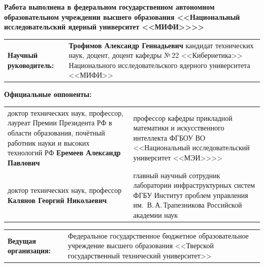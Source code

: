 \documentclass[12pt,a5paper]{article}
\begin{document}
{\scriptsize
\begin{center}
\textbf{Работа выполнена в федеральном государственном автономном
образовательном учреждении высшего образования
<<Национальный исследовательский ядерный университет <<МИФИ>>{}>>}
\end{center}

\vspace{0.15cm}

\noindent\begin{tabular}{@{}p{2.8cm}p{7.4cm}@{}}
\textbf{Научный руководитель:} & \textbf{Трофимов Александр Геннадьевич} \newline
кандидат технических наук, доцент, доцент кафедры №\,22 <<Кибернетика>> Национального исследовательского ядерного университета <<МИФИ>> \\
\end{tabular}

\vspace{0.15cm}

\noindent\textbf{Официальные оппоненты:}
\vspace{0.03cm}

\noindent\begin{tabular}{@{}p{2.8cm}p{7.4cm}@{}}
доктор технических наук, профессор, лауреат Премии Президента РФ в области образования, почётный работник науки и высоких технологий РФ
\newline \textbf{Еремеев Александр Павлович} &
профессор кафедры прикладной математики и искусственного интеллекта ФГБОУ ВО <<Национальный исследовательский университет <<МЭИ>>{}>> \\[0.1cm]

доктор технических наук, профессор
\newline \textbf{Калянов Георгий Николаевич} &
главный научный сотрудник лаборатории инфраструктурных систем ФГБУ Институт проблем управления им.~В.\,А.\,Трапезникова Российской академии наук \\
\end{tabular}

\vspace{0.15cm}

\noindent\begin{tabular}{@{}p{2.8cm}p{7.4cm}@{}}
\textbf{Ведущая организация:} & Федеральное государственное бюджетное образовательное учреждение высшего образования <<Тверской государственный технический университет>> \\
\end{tabular}

\vspace{0.15cm}

}
\end{document}
